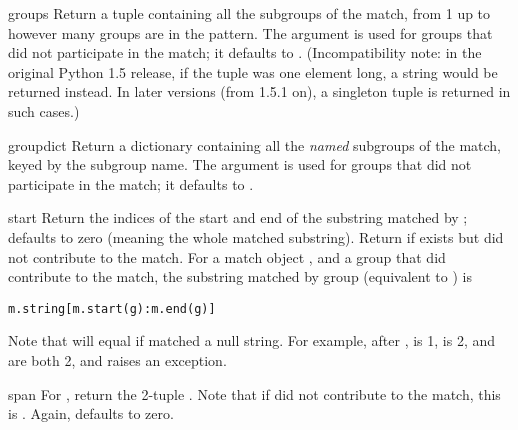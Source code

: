 \begin{methoddesc}[MatchObject]{groups}{}
Return a tuple containing all the subgroups of the match, from 1 up to
however many groups are in the pattern.  The  argument is
used for groups that did not participate in the match; it defaults to
.  (Incompatibility note: in the original Python 1.5
release, if the tuple was one element long, a string would be returned
instead.  In later versions (from 1.5.1 on), a singleton tuple is
returned in such cases.)
\end{methoddesc}

\begin{methoddesc}[MatchObject]{groupdict}{}
Return a dictionary containing all the \emph{named} subgroups of the
match, keyed by the subgroup name.  The  argument is
used for groups that did not participate in the match; it defaults to
.
\end{methoddesc}

\begin{methoddesc}[MatchObject]{start}{}
Return the indices of the start and end of the substring
matched by ;  defaults to zero (meaning the whole
matched substring).
Return  if  exists but
did not contribute to the match.  For a match object
, and a group  that did contribute to the match, the
substring matched by group  (equivalent to
) is

\begin{verbatim}
m.string[m.start(g):m.end(g)]
\end{verbatim}

Note that
 will equal  if
 matched a null string.  For example, after ,  is 1,
 is 2,  and
 are both 2, and  raises
an  exception.
\end{methoddesc}

\begin{methoddesc}[MatchObject]{span}{}
For  , return the 2-tuple
.
Note that if  did not contribute to the match, this is
.  Again,  defaults to zero.
\end{methoddesc}

